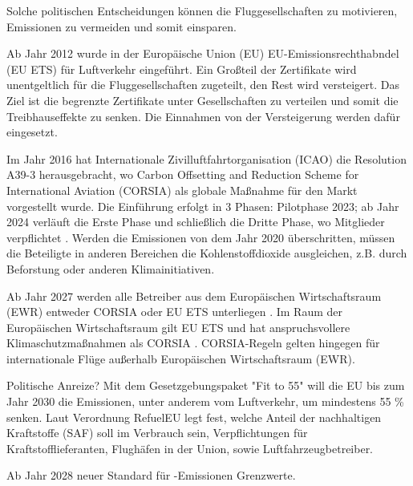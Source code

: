 

Solche politischen Entscheidungen können die Fluggesellschaften zu motivieren, Emissionen zu vermeiden und somit einsparen.

Ab Jahr 2012 wurde in der Europäische Union (EU) EU-Emissionsrechthabndel (EU ETS) für Luftverkehr eingeführt.
Ein Großteil der Zertifikate wird unentgeltlich für die Fluggesellschaften zugeteilt, den Rest wird versteigert. 
Das Ziel ist die begrenzte Zertifikate unter Gesellschaften zu verteilen und somit die Treibhauseffekte zu senken.
Die Einnahmen von der Versteigerung werden dafür eingesetzt.\cite{conrady2019luftverkehr}

Im Jahr 2016 hat Internationale Zivilluftfahrtorganisation (ICAO) die Resolution A39-3 herausgebracht, 
wo Carbon Offsetting and Reduction Scheme for International Aviation (CORSIA) als globale Maßnahme für den Markt vorgestellt wurde. 
Die Einführung erfolgt in 3 Phasen: 
Pilotphase 2023; ab Jahr 2024 verläuft die Erste Phase und schließlich die Dritte Phase, wo Mitglieder verpflichtet
\cite{conrady2019luftverkehr}. 
Werden die Emissionen von dem Jahr 2020 überschritten, müssen die Beteiligte in anderen Bereichen die Kohlenstoffdioxide ausgleichen, z.B.
durch Beforstung oder anderen Klimainitiativen. 

Ab Jahr 2027 werden alle Betreiber aus dem Europäischen Wirtschaftsraum (EWR) entweder CORSIA oder EU ETS unterliegen \cite{uba_aviation_2023}.
Im Raum der Europäischen Wirtschaftsraum gilt EU ETS und hat anspruchsvollere Klimaschutzmaßnahmen als CORSIA \cite{uba_aviation_2023}.
CORSIA-Regeln gelten hingegen für internationale Flüge außerhalb Europäischen Wirtschaftsraum (EWR).

Politische Anreize?
Mit dem Gesetzgebungspaket "Fit to 55" will die EU bis zum Jahr 2030 die Emissionen, unter anderem vom Luftverkehr, um mindestens 55 \% senken.
Laut Verordnung RefuelEU legt fest, welche Anteil der nachhaltigen Kraftstoffe (SAF) soll im Verbrauch sein, Verpflichtungen für 
Kraftstofflieferanten, Flughäfen in der Union, sowie Luftfahrzeugbetreiber.

Ab Jahr 2028 neuer Standard für -Emissionen Grenzwerte.